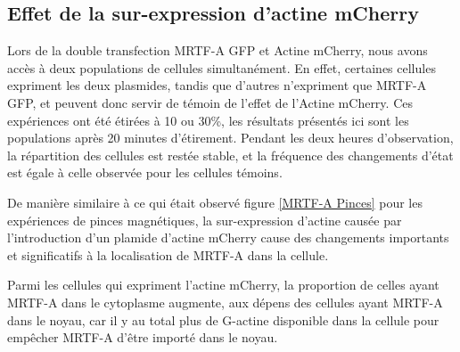 \subsection{Effet de la sur-expression d'actine mCherry}

Lors de la double transfection MRTF-A GFP et Actine mCherry, nous avons accès à deux populations de cellules simultanément. En effet, certaines cellules expriment les deux plasmides, tandis que d'autres n'expriment que MRTF-A GFP, et peuvent donc servir de témoin de l'effet de l'Actine mCherry. 
Ces expériences ont été étirées à 10 ou 30\%, les résultats présentés ici sont les populations après 20 minutes d'étirement. Pendant les deux heures d'observation, la répartition des cellules est restée stable, et la fréquence des changements d'état est égale à celle observée pour les cellules témoins. 

De manière similaire à ce qui était observé figure \ref{MRTF-A Pinces} pour les expériences de pinces magnétiques, la sur-expression d'actine causée par l'introduction d'un plamide d'actine mCherry cause des changements importants et significatifs à la localisation de MRTF-A dans la cellule. 

Parmi les cellules qui expriment l'actine mCherry, la proportion de celles ayant MRTF-A dans le cytoplasme augmente, aux dépens des cellules ayant MRTF-A dans le noyau, car il y au total plus de G-actine disponible dans la cellule pour empêcher MRTF-A d'être importé dans le noyau. 

